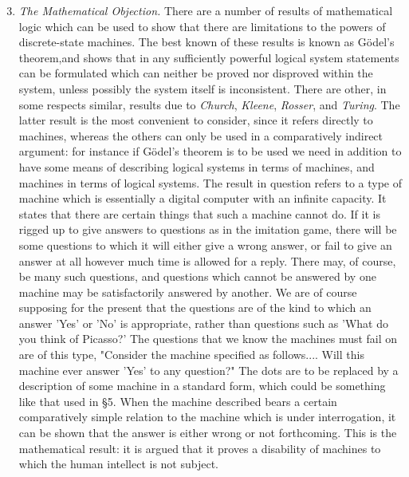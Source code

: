 \documentclass[12pt]{article}
\begin{document}
    \begin{enumerate}[label=(\arabic*)]
        \setcounter{enumi}{2}
        \item{\textit{The Mathematical Objection.} There are a number of results of mathematical logic which can be used to show that there are limitations to the powers of discrete-state machines. The best known of these results is known as Gödel's theorem,\footnotemark[1] and shows that in any sufficiently powerful logical system statements can be formulated which can neither be proved nor disproved within the system, unless possibly the system itself is inconsistent. There are other, in some respects similar, results due to \textit{Church}, \textit{Kleene}, \textit{Rosser}, and \textit{Turing}. The latter result is the most convenient to consider, since it refers directly to machines, whereas the others can only be used in a comparatively indirect argument: for instance if Gödel's theorem is to be used we need in addition to have some means of describing logical systems in terms of machines, and machines in terms of logical systems. The result in question refers to a type of machine which is essentially a digital computer with an infinite capacity. It states that there are certain things that such a machine cannot do. If it is rigged up to give answers to questions as in the imitation game, there will be some questions to which it will either give a wrong answer, or fail to give an answer at all however much time is allowed for a reply. There may, of course, be many such questions, and questions which cannot be answered by one machine may be satisfactorily answered by another. We are of course supposing for the present that the questions are of the kind to which an answer 'Yes' or 'No' is appropriate, rather than questions such as 'What do you think of Picasso?' The questions that we know the machines must fail on are of this type, "Consider the machine specified as follows.... Will this machine ever answer 'Yes' to any question?" The dots are to be replaced by a description of some machine in a standard form, which could be something like that used in \S 5. When the machine described bears a certain comparatively simple relation to the machine which is under interrogation, it can be shown that the answer is either wrong or not forthcoming. This is the mathematical result: it is argued that it proves a disability of machines to which the human intellect is not subject.}
    \end{enumerate}
\end{document}
